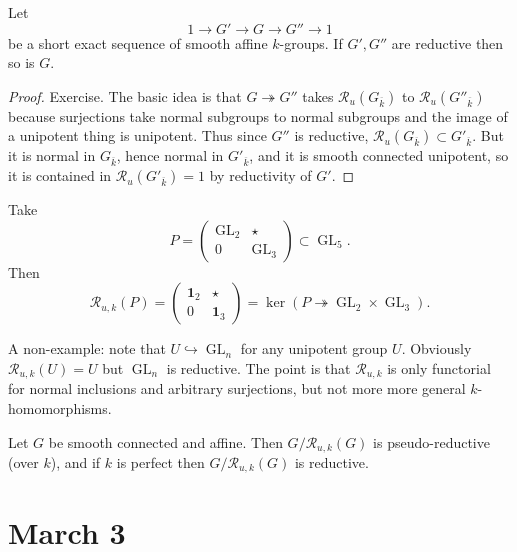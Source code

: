 \documentclass[10pt]{article}
\renewcommand{\(}{\left(}
\renewcommand{\)}{\right)}
\numberwithin{thm}{subsection}
\begin{document}
\begin{lem}\label{}
Let 
\[1\rightarrow G'\rightarrow G\rightarrow G''\rightarrow 1\]
be a short exact sequence of smooth affine $k$-groups.
If $G',G''$ are reductive then so is $G$.
\end{lem}
\begin{proof}
Exercise. The basic idea
is that $G\twoheadrightarrow G''$
takes $\mathscr{R}_{u}(G_{\overline{k}})$ to $\mathscr{R}_{u}(G''_{\overline{k}})$
because surjections take normal subgroups to normal subgroups
and the image of a unipotent thing is unipotent.
Thus since $G''$ is reductive,
$\mathscr{R}_{u}(G_{\overline{k}})\subset G'_{\overline{k}}$. 
But it is normal in $G_{\overline{k}}$,
hence normal in $G'_{\overline{k}}$,
and it is smooth connected unipotent,
so it is contained in $\mathscr{R}_{u}(G'_{\overline{k}})=1$
by reductivity of $G'$.
\end{proof}

\begin{ex}\label{}
Take
\[P=\left(\begin{smallmatrix}
 \operatorname{GL}_2&\star\\0&\operatorname{GL}_3
\end{smallmatrix}\right)\subset \operatorname{GL}_5.\]
Then
\[\mathscr{R}_{u,k}
(P)=\left(\begin{smallmatrix}
\mathbf{1}_2&\star\\0&\mathbf{1}_3 
\end{smallmatrix}\right)=\operatorname{ker}(P\twoheadrightarrow \operatorname{GL}_2\times \operatorname{GL}_3).\]
\end{ex}
\begin{ex}
\label{}
A non-example:
note that $U\hookrightarrow \operatorname{GL}_n$
for any unipotent group $U$.
Obviously $\mathscr{R}_{u,k}(U)=U$
but $\operatorname{GL}_n$ is reductive.
The point is that $\mathscr{R}_{u,k}$ is only
functorial for normal inclusions and arbitrary surjections,
but not more more general $k$-homomorphisms.
\end{ex}
\begin{ex}\label{}
Let $G$ be smooth connected and affine.
Then $G/\mathscr{R}_{u,k}(G)$ is pseudo-reductive (over $k$), 
and if $k$ is perfect
then $G/\mathscr{R}_{u,k}(G)$ is reductive.
\end{ex}

\section{March 3}
\end{document}
